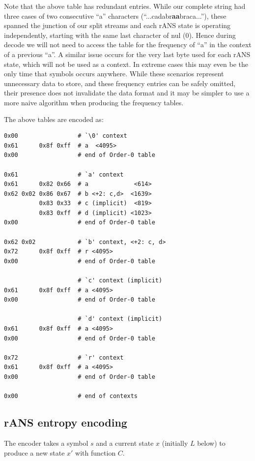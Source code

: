 \documentclass[a4paper]{article}
\begin{document}
Note that the above table has redundant entries.  While our complete
string had three cases of two consecutive ``a'' characters
(``...cadabr\textbf{aa}braca...''), these spanned the junction of our
split streams and each rANS state is operating independently, starting
with the same last character of nul (0).  Hence during decode we will
not need to access the table for the frequency of ``a'' in the context
of a previous ``a''.  A similar issue occurs for the very last byte
used for each rANS state, which will not be used as a context.  In
extreme cases this may even be the only time that symbols occurs
anywhere.  While these scenarios represent unnecessary data to store,
and these frequency entries can be safely omitted, their presence does
not invalidate the data format and it may be simpler to use a more
naive algorithm when producing the frequency tables.


The above tables are encoded as:
\begin{verbatim}
0x00                 # `\0' context
0x61      0x8f 0xff  # a  <4095>
0x00                 # end of Order-0 table

0x61                 # `a' context
0x61      0x82 0x66  # a             <614>
0x62 0x02 0x86 0x67  # b <+2: c,d>  <1639>
          0x83 0x33  # c (implicit)  <819>
          0x83 0xff  # d (implicit) <1023>
0x00                 # end of Order-0 table

0x62 0x02            # `b' context, <+2: c, d>
0x72      0x8f 0xff  # r <4095>
0x00                 # end of Order-0 table

                     # `c' context (implicit)
0x61      0x8f 0xff  # a <4095>
0x00                 # end of Order-0 table

                     # `d' context (implicit)
0x61      0x8f 0xff  # a <4095>
0x00                 # end of Order-0 table

0x72                 # `r' context
0x61      0x8f 0xff  # a <4095>
0x00                 # end of Order-0 table

0x00                 # end of contexts
\end{verbatim}

\subsection{rANS entropy encoding}

The encoder takes a symbol $s$ and a current state $x$ (initially $L$ below) to
produce a new state $x'$ with function $C$.
\end{document}
